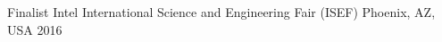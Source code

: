 




\begin{cvhonors}

\cvhonor
{Finalist} %
{Intel International Science and Engineering Fair (ISEF)} %
{Phoenix, AZ, USA} %
{2016} %


\end{cvhonors}




